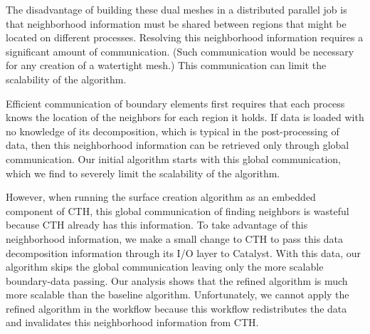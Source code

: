 The disadvantage of building these dual meshes in a distributed parallel
job is that neighborhood information must be shared between regions that
might be located on different processes.  Resolving this neighborhood
information requires a significant amount of communication.  (Such
communication would be necessary for any creation of a watertight mesh.)
This communication can limit the scalability of the algorithm.

Efficient communication of boundary elements first requires that each
process knows the location of the neighbors for each region it holds.  If
data is loaded with no knowledge of its decomposition, which is typical in
the post-processing of data, then this neighborhood information can be
retrieved only through global communication.  Our initial
 algorithm starts with this global communication, which
we find to severely limit the scalability of the algorithm.

However, when running the surface creation algorithm as an embedded \insitu
component of CTH, this global communication of finding neighbors is
wasteful because CTH already has this information.  To take advantage of
this neighborhood information, we make a small change to CTH to pass this
data decomposition information through its I/O layer to Catalyst.  With
this data, our  algorithm skips the global communication
leaving only the more scalable boundary-data passing.  Our analysis shows
that the refined algorithm is much more scalable than the baseline
algorithm.  Unfortunately, we cannot apply the refined
algorithm in the \intransit workflow because this workflow redistributes
the data and invalidates this neighborhood information from CTH.

